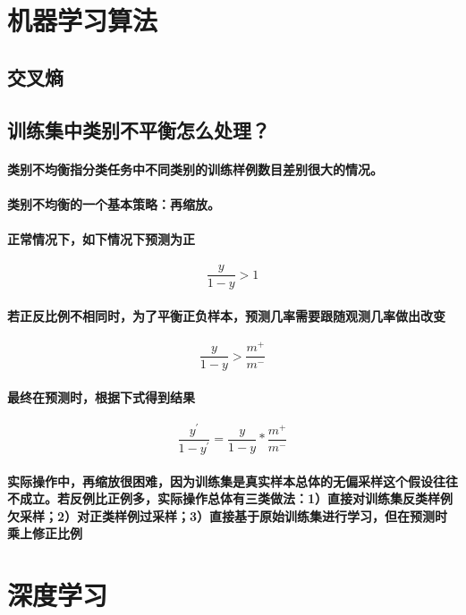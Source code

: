 \documentclass[UTF8]{ctexart}
\begin{document}
\section{机器学习算法}
\subsection{交叉熵}
\paragraph{}
\subsection{训练集中类别不平衡怎么处理？}
\paragraph{类别不均衡指分类任务中不同类别的训练样例数目差别很大的情况。}
\paragraph{类别不均衡的一个基本策略：再缩放。}
\paragraph{正常情况下，如下情况下预测为正}
\begin{equation}
    \frac{y}{1-y}>1
\end{equation}
\paragraph{若正反比例不相同时，为了平衡正负样本，预测几率需要跟随观测几率做出改变}
\begin{equation}
    \frac{y}{1-y}>\frac{{m}^{+}}{{m}^{-}}
\end{equation}
\paragraph{最终在预测时，根据下式得到结果}
\begin{equation}
    \frac{y^{'}}{1-y^{'}}=\frac{y}{1-y}*\frac{{m}^{+}}{{m}^{-}}
\end{equation}
\paragraph{实际操作中，再缩放很困难，因为训练集是真实样本总体的无偏采样这个假设往往不成立。若反例比正例多，实际操作总体有三类做法：1）直接对训练集反类样例欠采样；2）对正类样例过采样；3）直接基于原始训练集进行学习，但在预测时乘上修正比例}
\section{深度学习}
\end{document}
